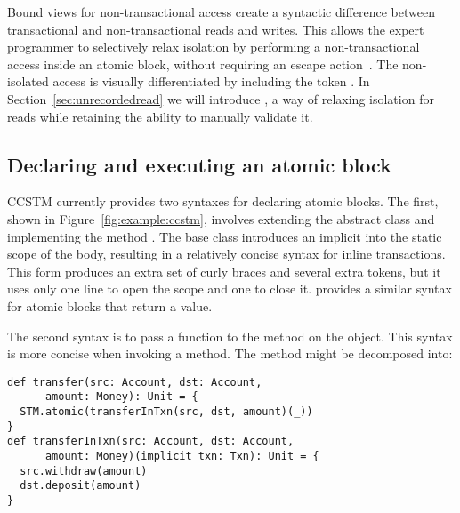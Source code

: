Bound views for non-transactional access create a syntactic difference
between transactional and non-transactional reads and writes.
This allows the expert programmer to selectively relax isolation by
performing a non-transactional access inside an atomic block, without
requiring an escape action~\cite{escapeaction}.  The non-isolated access
is visually differentiated by including the token .  In
Section~\ref{sec:unrecordedread} we will introduce ,
a way of relaxing isolation for reads while retaining the ability to
manually validate it.

\subsection{Declaring and executing an atomic block}

CCSTM currently provides two syntaxes for declaring atomic blocks.  The first,
shown in Figure~\ref{fig:example:ccstm}, involves extending the
abstract class  and implementing the method .  The base class introduces an implicit  into the
static scope of the body, resulting in a relatively concise syntax for
inline transactions.  This form produces an extra set of curly braces
and several extra tokens, but it uses only one line to open the scope
and one to close it.   provides a similar syntax
for atomic blocks that return a value.

The second syntax is to pass a function \code{~=>~}
to the  method on the  object.  This syntax is more
concise when invoking a method.  The  method
might be decomposed into:
\lstset{numbers=none}
\begin{lstlisting}
def transfer(src: Account, dst: Account,
      amount: Money): Unit = {
  STM.atomic(transferInTxn(src, dst, amount)(_))
}
def transferInTxn(src: Account, dst: Account,
      amount: Money)(implicit txn: Txn): Unit = {
  src.withdraw(amount)
  dst.deposit(amount)
}
\end{lstlisting}
\lstset{numbers=left}

